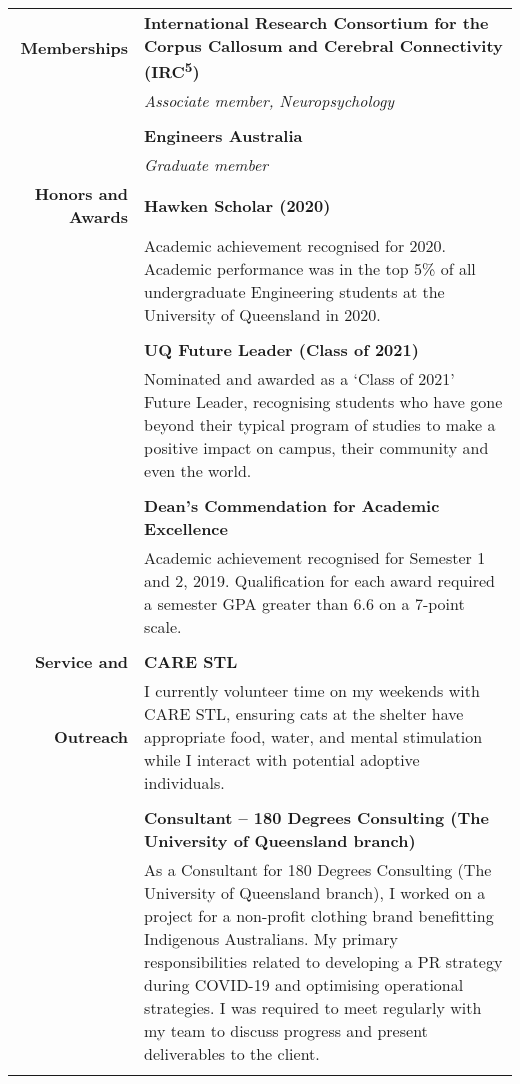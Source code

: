\documentclass[a4paper]{article}
\begin{document}
\begin{longtable}{r p{13.5cm}}
	\textbf{Memberships} 	  			\vline & \textbf{International Research Consortium for the
Corpus Callosum and Cerebral Connectivity (IRC\textsuperscript{5})} \\
										\vline & \textit{Associate member, Neuropsychology} \\ 
										\vline & \\
										
										\vline & \textbf{Engineers Australia} \\
										\vline & \textit{Graduate member} \\ 
										
	\textbf{Honors and Awards}			\vline & \textbf{Hawken Scholar (2020)} \\
										\vline & Academic achievement recognised for 2020. Academic performance was in the top 5\% of all undergraduate Engineering students at the University of Queensland in 2020. \\
										\vline & \\
										\vline & \textbf{UQ Future Leader (Class of 2021)} \\
										\vline & Nominated and awarded as a `Class of 2021' Future Leader, recognising students who have gone beyond their typical program of studies to make a positive impact on campus, their community and even the world. \\
										\vline & \\	

										\vline & \textbf{Dean's Commendation for Academic Excellence} \\
										\vline & Academic achievement recognised for Semester 1 and 2, 2019. Qualification for each award required a semester GPA greater than 6.6 on a 7-point scale. \\
										\vline & \\

	\textbf{Service and}				\vline & \textbf{CARE STL} \\
	\textbf{Outreach}					\vline & I currently volunteer time on my weekends with CARE STL, ensuring cats at the shelter have appropriate food, water, and mental stimulation while I interact with potential adoptive individuals. \\		
										\vline & \\		
										\vline & \textbf{Consultant – 180 Degrees Consulting (The University of Queensland branch)} \\
										\vline & As a Consultant for 180 Degrees Consulting (The University of Queensland branch), I worked on a project for a non-profit clothing brand benefitting Indigenous Australians. My primary responsibilities related to developing a PR strategy during COVID-19 and optimising operational strategies. I was required to meet regularly with my team to discuss progress and present deliverables to the client. \\	
										\vline & \\


\end{longtable}
\end{document}
